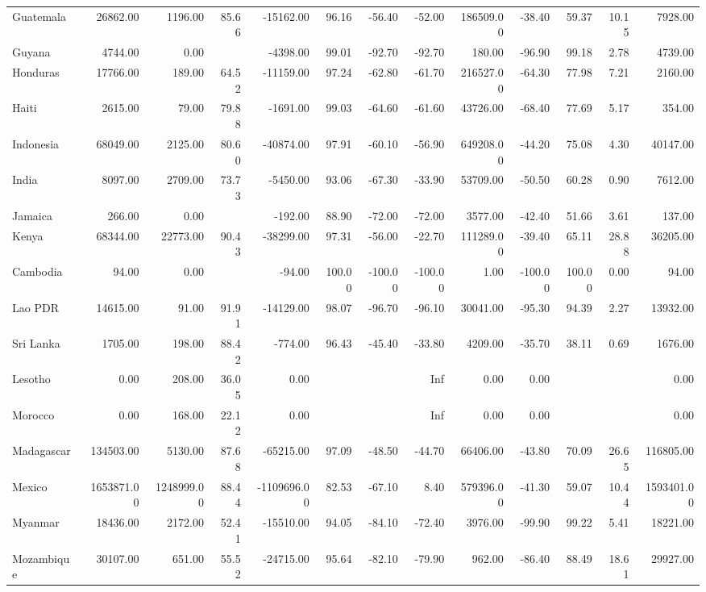 \begin{table}[ht]
\begin{tabular}{lrrrrrrrrrrrr}
  Guatemala & 26862.00 & 1196.00 & 85.66 & -15162.00 & 96.16 & -56.40 & -52.00 & 186509.00 & -38.40 & 59.37 & 10.15 & 7928.00 \\ 
  Guyana & 4744.00 & 0.00 &  & -4398.00 & 99.01 & -92.70 & -92.70 & 180.00 & -96.90 & 99.18 & 2.78 & 4739.00 \\ 
  Honduras & 17766.00 & 189.00 & 64.52 & -11159.00 & 97.24 & -62.80 & -61.70 & 216527.00 & -64.30 & 77.98 & 7.21 & 2160.00 \\ 
  Haiti & 2615.00 & 79.00 & 79.88 & -1691.00 & 99.03 & -64.60 & -61.60 & 43726.00 & -68.40 & 77.69 & 5.17 & 354.00 \\ 
  Indonesia & 68049.00 & 2125.00 & 80.60 & -40874.00 & 97.91 & -60.10 & -56.90 & 649208.00 & -44.20 & 75.08 & 4.30 & 40147.00 \\ 
  India & 8097.00 & 2709.00 & 73.73 & -5450.00 & 93.06 & -67.30 & -33.90 & 53709.00 & -50.50 & 60.28 & 0.90 & 7612.00 \\ 
  Jamaica & 266.00 & 0.00 &  & -192.00 & 88.90 & -72.00 & -72.00 & 3577.00 & -42.40 & 51.66 & 3.61 & 137.00 \\ 
  Kenya & 68344.00 & 22773.00 & 90.43 & -38299.00 & 97.31 & -56.00 & -22.70 & 111289.00 & -39.40 & 65.11 & 28.88 & 36205.00 \\ 
  Cambodia & 94.00 & 0.00 &  & -94.00 & 100.00 & -100.00 & -100.00 & 1.00 & -100.00 & 100.00 & 0.00 & 94.00 \\ 
  Lao PDR & 14615.00 & 91.00 & 91.91 & -14129.00 & 98.07 & -96.70 & -96.10 & 30041.00 & -95.30 & 94.39 & 2.27 & 13932.00 \\ 
  Sri Lanka & 1705.00 & 198.00 & 88.42 & -774.00 & 96.43 & -45.40 & -33.80 & 4209.00 & -35.70 & 38.11 & 0.69 & 1676.00 \\ 
  Lesotho & 0.00 & 208.00 & 36.05 & 0.00 &  &  & Inf & 0.00 & 0.00 &  &  & 0.00 \\ 
  Morocco & 0.00 & 168.00 & 22.12 & 0.00 &  &  & Inf & 0.00 & 0.00 &  &  & 0.00 \\ 
  Madagascar & 134503.00 & 5130.00 & 87.68 & -65215.00 & 97.09 & -48.50 & -44.70 & 66406.00 & -43.80 & 70.09 & 26.65 & 116805.00 \\ 
  Mexico & 1653871.00 & 1248999.00 & 88.44 & -1109696.00 & 82.53 & -67.10 & 8.40 & 579396.00 & -41.30 & 59.07 & 10.44 & 1593401.00 \\ 
  Myanmar & 18436.00 & 2172.00 & 52.41 & -15510.00 & 94.05 & -84.10 & -72.40 & 3976.00 & -99.90 & 99.22 & 5.41 & 18221.00 \\ 
  Mozambique & 30107.00 & 651.00 & 55.52 & -24715.00 & 95.64 & -82.10 & -79.90 & 962.00 & -86.40 & 88.49 & 18.61 & 29927.00 \\ 

\end{tabular}
\end{table}
